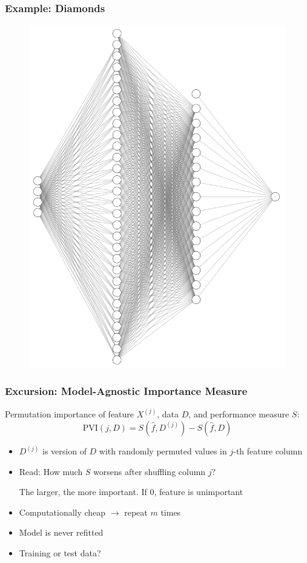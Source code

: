 \begin{frame}
	\frametitle{Example: Diamonds}
	\begin{figure}
		\includegraphics[width=0.6\textheight]{../figs/nn_2_hidden.png}
	\end{figure}
\end{frame}

\begin{frame}
	\frametitle{Excursion: Model-Agnostic Importance Measure}
	\alert{Permutation importance} of feature $X^{(j)}$, data $D$, and performance measure $S$:
	$$
	\text{PVI}(j, D) = S(\hat f, D^{(j)}) - S(\hat f, D)
	$$
	\vspace{-1.5em}
	\begin{itemize}
		\item $D^{(j)}$ is version of $D$ with randomly permuted values in $j$-th feature column
		\item Read: How much $S$ worsens after shuffling column $j$? 
		
		The larger, the more important. If 0, feature is unimportant
		\item Computationally cheap $\rightarrow$ repeat $m$ times
		\item Model is never refitted
		\item Training or test data?
	\end{itemize}
	
	\vfill
	
	\begin{example}
	\end{example}
\end{frame}

